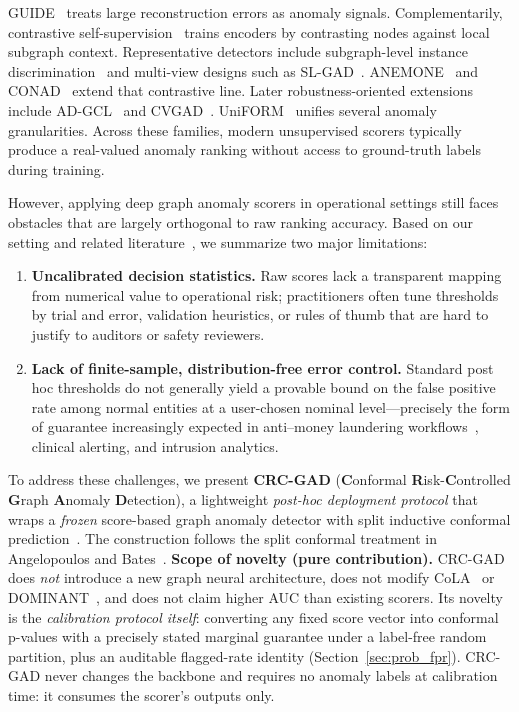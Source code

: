 \documentclass[a4paper]{cas-dc}
\theoremstyle{definition}
\begin{document}
GUIDE~\cite{yuan2021guide} treats large reconstruction errors as anomaly signals.
Complementarily, contrastive self-supervision~\cite{chen2020simclr,oord2018representation} trains encoders by contrasting nodes against local subgraph context.
Representative detectors include subgraph-level instance discrimination~\cite{liu2022cola} and multi-view designs such as SL-GAD~\cite{zheng2021slgad}.
ANEMONE~\cite{jin2021anemone} and CONAD~\cite{xu2022conad} extend that contrastive line.
Later robustness-oriented extensions include AD-GCL~\cite{luo2025adgcl} and CVGAD~\cite{shi2025cvgad}.
UniFORM~\cite{qiao2025uniform} unifies several anomaly granularities.
Across these families, modern unsupervised scorers typically produce a real-valued anomaly ranking without access to ground-truth labels during training.

However, applying deep graph anomaly scorers in operational settings still faces obstacles that are largely orthogonal to raw ranking accuracy.
Based on our setting and related literature~\cite{ma2021comprehensive,bates2023testing}, we summarize two major limitations:
\begin{enumerate}
  \item \textbf{Uncalibrated decision statistics.} Raw scores lack a transparent mapping from numerical value to operational risk; practitioners often tune thresholds by trial and error, validation heuristics, or rules of thumb that are hard to justify to auditors or safety reviewers.
  \item \textbf{Lack of finite-sample, distribution-free error control.} Standard post hoc thresholds do not generally yield a provable bound on the false positive rate among normal entities at a user-chosen nominal level---precisely the form of guarantee increasingly expected in anti--money laundering workflows~\cite{bates2023testing}, clinical alerting, and intrusion analytics.
\end{enumerate}

To address these challenges, we present \textbf{CRC-GAD} (\textbf{C}onformal \textbf{R}isk-\textbf{C}ontrolled \textbf{G}raph \textbf{A}nomaly \textbf{D}etection), a lightweight \emph{post-hoc deployment protocol} that wraps a \emph{frozen} score-based graph anomaly detector with split inductive conformal prediction~\cite{vovk2005algorithmic,papadopoulos2002inductive}.
The construction follows the split conformal treatment in Angelopoulos and Bates~\cite{angelopoulos2023conformal}.
\textbf{Scope of novelty (pure contribution).} CRC-GAD does \emph{not} introduce a new graph neural architecture, does not modify CoLA~\cite{liu2022cola} or DOMINANT~\cite{ding2019dominant}, and does not claim higher AUC than existing scorers.
Its novelty is the \emph{calibration protocol itself}: converting any fixed score vector into conformal p-values with a precisely stated marginal guarantee under a label-free random partition, plus an auditable flagged-rate identity (Section~\ref{sec:prob_fpr}).
CRC-GAD never changes the backbone and requires no anomaly labels at calibration time: it consumes the scorer's outputs only.
\end{document}
